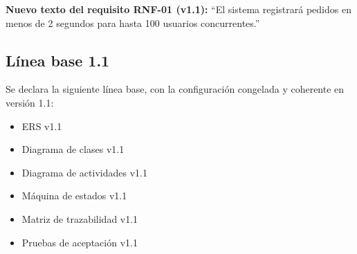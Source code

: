 \documentclass[11pt,a4paper]{article}
\begin{document}
\textbf{Nuevo texto del requisito RNF-01 (v1.1):} ``El sistema registrará pedidos en
menos de 2 segundos para hasta 100 usuarios concurrentes.''

\subsection*{Línea base 1.1}
Se declara la siguiente línea base, con la configuración congelada y coherente en
versión 1.1:

\begin{itemize}[leftmargin=1.4cm]
\item ERS v1.1
\item Diagrama de clases v1.1
\item Diagrama de actividades v1.1
\item Máquina de estados v1.1
\item Matriz de trazabilidad v1.1
\item Pruebas de aceptación v1.1
\end{itemize}
\end{document}
